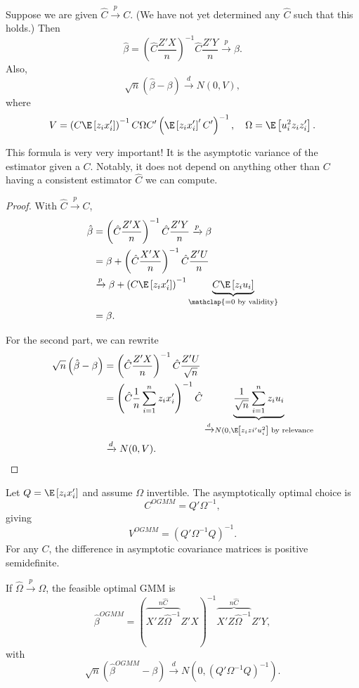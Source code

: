\begin{proposition}
	Suppose we are given $\hat{C}\xrightarrow{p}C$. (We have not yet determined any $\hat{C}$ such that this holds.) Then \[
		\hat{\beta} = \left(\hat{C}\frac{Z'X}{n}\right)^{-1}\hat{C}\frac{Z'Y}{n} \xrightarrow{p} \beta
	.\]
	Also, \[
		\sqrt{n}(\hat{\beta}-\beta) \xrightarrow{d} N(0,V)
	,\]
	where \[
		V = \left(C\E\left[z_i x_i'\right]\right)^{-1}C\Omega C'\left(\E\left[z_i x_i'\right]'C'\right)^{-1}, \quad \Omega = \E\left[u_i^2 z_i z_i'\right]
	.\]
\end{proposition}

This formula is very very important! It is the asymptotic variance of the estimator given a $C$. Notably, it does not depend on anything other than $C$ having a consistent estimator $\hat{C}$ we can compute.

\begin{proof}
	With $\hat{C} \xrightarrow{p} C$, 
	\begin{align*}
		\hat{\beta} &= \left(\hat{C}\frac{Z'X}{n}\right)^{-1}\hat{C}\frac{Z'Y}{n} \xrightarrow{p} \beta \\
					&= \beta + \left( \hat{C} \frac{X'X}{n} \right)^{-1} \hat{C} \frac{Z'U}{n} \\
					&\xrightarrow{p} \beta + \left( C \E\left[z_ix_i'\right]  \right)^{-1} \underbrace{C \E\left[z_i u_i\right] }_{\mathclap{=0\text{ by validity}}} \\
					&= \beta
	.\end{align*}

	For the second part, we can rewrite
	\begin{align*}
		\sqrt{n} \left( \hat{\beta} - \beta \right)
		&= \left( \hat{C} \frac{Z'X}{n} \right)^{-1} \hat{C} \frac{Z' U}{\sqrt{n} } \\
		&= \left( \hat{C} \frac{1}{n }\sum\limits_{i=1}^{n} z_i x_i' \right)^{-1} \hat{C} \underbrace{\frac{1}{\sqrt{n} } \sum\limits_{i=1}^{n} z_i u_i}_{\xrightarrow{d} N(0, \E\left[z_izi' u_i^2\right] \text{ by relevance}} \\
		&\xrightarrow{d} N(0,V)
	.\end{align*}
\end{proof}

\begin{proposition}
	Let $Q=\E\left[z_i x_i'\right]$ and assume $\Omega$ invertible. The asymptotically optimal choice is \[
		C^{OGMM}=Q'\Omega^{-1}
	,\]
	giving \[
		V^{OGMM} = (Q'\Omega^{-1}Q)^{-1}
	.\]
	For any $C$, the difference in asymptotic covariance matrices is positive semidefinite.

	If $\hat{\Omega}\xrightarrow{p}\Omega$, the feasible optimal GMM is \[
		\hat{\beta}^{OGMM} = (\overbrace{X'Z\hat{\Omega}^{-1}}^{n \hat{C}}Z'X)^{-1}\overbrace{X'Z\hat{\Omega}^{-1}}^{n \hat{C}}Z'Y
	,\]
	with \[
		\sqrt{n}(\hat{\beta}^{OGMM}-\beta) \xrightarrow{d} N\left(0,(Q'\Omega^{-1}Q)^{-1}\right)
	.\]
\end{proposition}

